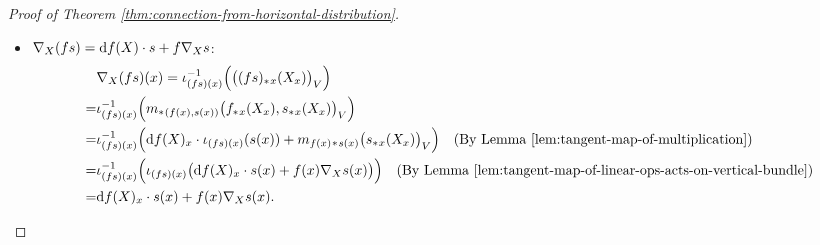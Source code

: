 \begin{proof}[Proof of Theorem \ref{thm:connection-from-horizontal-distribution}]
\begin{itemize}
        For $\mathbb{R}$-linearity, 
        \begin{align*}
            &\nabla_X (\lambda s)(x) = \iota_{(\lambda s)(x)}^{-1}\Big(\big((\lambda s)_*{}_x(X_x)\big)_V\Big) \\
            =& \iota_{(\lambda s)(x)}^{-1}\Big(\big(m_{\lambda}{}_*{}_{s(x)}s_*{}_x(X_x)\big)_V\Big) \\
            =& \iota_{(\lambda s)(x)}^{-1}\Big(m_{\lambda}{}_*{}_{s(x)}\big(s_*{}_x(X_x)\big)_V\Big) 
            \quad\text{(By Lemma \ref{lem:H-compatible-with-linear-str})}\\
            =& \iota_{(\lambda s)(x)}^{-1}\Big(\iota_{(\lambda s)(x)}(\lambda \nabla_X s(x))\Big) 
            \quad\text{(By Lemma \ref{lem:tangent-map-of-linear-ops-acts-on-vertical-bundle})}\\
            =& \lambda \nabla_X s(x),
        \end{align*}
        For additivity,
        \begin{align*}
            &\nabla_X (s_1 + s_2)(x) = \iota_{(s_1 + s_2)(x)}^{-1}\Big(\big((s_1 + s_2)_*{}_x(X_x)\big)_V\Big) \\
            =& \iota_{(s_1 + s_2)(x)}^{-1}\Big(\big(a_*{}_{(s_1(x),s_2(x))}(s_{1*}{}_x(X_x), s_{2*}{}_x(X_x))\big)_V\Big) \\
            =& \iota_{(s_1 + s_2)(x)}^{-1}\Big(a_*{}_{(s_1(x),s_2(x))}\big((s_{1*}{}_x(X_x))_V, (s_{2*}{}_x(X_x))_V\big)\Big) 
            \quad\text{(By Lemma \ref{lem:H-compatible-with-linear-str})}\\
            =& \iota_{(s_1 + s_2)(x)}^{-1}\Big(\iota_{(s_1 + s_2)(x)}(\nabla_X s_1(x) + \nabla_X s_2(x))\Big) 
            \quad\text{(By Lemma \ref{lem:tangent-map-of-linear-ops-acts-on-vertical-bundle})}\\
            =& \nabla_X s_1(x) + \nabla_X s_2(x).
        \end{align*}
        \item $\nabla_X (fs) = {\rm d} f(X)\cdot s + f\nabla_X s$:
        \begin{align*}
            &\nabla_X (fs)(x) = \iota_{(fs)(x)}^{-1}\Big(\big((fs)_*{}_x(X_x)\big)_V\Big) \\
            =& \iota_{(fs)(x)}^{-1}\Big(m_*{}_{(f(x),s(x))}\big(f_*{}_x(X_x), s_*{}_x(X_x)\big)_V\Big) \\ 
            =& \iota_{(fs)(x)}^{-1}\Big({\rm d} f(X)_x\cdot \iota_{(fs)(x)}(s(x)) + m_{f(x)}{}_*{}_{s(x)}\big(s_*{}_x(X_x)\big)_V\Big) 
            \quad\text{(By Lemma \ref{lem:tangent-map-of-multiplication})}\\
            =& \iota_{(fs)(x)}^{-1}\Big(\iota_{(fs)(x)}\big({\rm d} f(X)_x\cdot s(x) + f(x)\nabla_X s(x)\big)\Big) 
            \quad\text{(By Lemma \ref{lem:tangent-map-of-linear-ops-acts-on-vertical-bundle})}\\
            =& {\rm d} f(X)_x\cdot s(x) + f(x)\nabla_X s(x).
        \end{align*}
    \end{itemize}
\end{proof}
